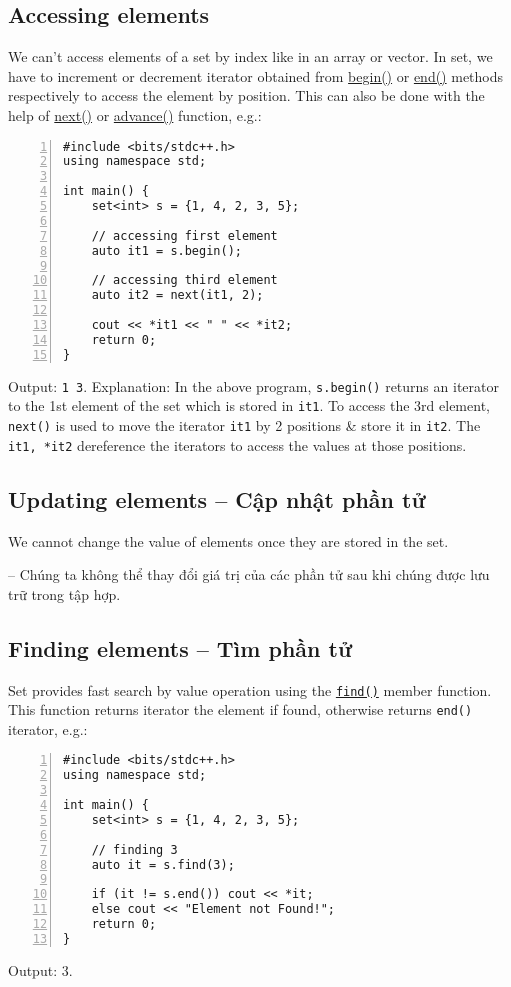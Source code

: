 \documentclass{article}
\begin{document}
\subsection{Accessing elements}
We can't access elements of a set by index like in an array or vector. In set, we have to increment or decrement iterator obtained from \href{https://www.geeksforgeeks.org/access-element-in-set-in-cpp/}{begin()} or \href{https://www.geeksforgeeks.org/setbegin-setend-c-stl/}{end()} methods respectively to access the element by position. This can also be done with the help of \href{https://www.geeksforgeeks.org/stdnext-in-cpp/}{next()} or \href{https://www.geeksforgeeks.org/stdadvance-in-cpp/}{advance()} function, e.g.:
\begin{Verbatim}[numbers=left,xleftmargin=5mm]
#include <bits/stdc++.h>
using namespace std;

int main() {
    set<int> s = {1, 4, 2, 3, 5};
	
    // accessing first element
    auto it1 = s.begin();
	
    // accessing third element
    auto it2 = next(it1, 2);
	
    cout << *it1 << " " << *it2;
    return 0;
}
\end{Verbatim}
Output: {\tt1 3}. Explanation: In the above program, {\tt s.begin()} returns an iterator to the 1st element of the set which is stored in {\tt it1}. To access the 3rd element, {\tt next()} is used to move the iterator {\tt it1} by 2 positions \& store it in {\tt it2}. The {\tt*it1, *it2} dereference the iterators to access the values at those positions.


\subsection{Updating elements -- Cập nhật phần tử}
We cannot change the value of elements once they are stored in the set.

-- Chúng ta không thể thay đổi giá trị của các phần tử sau khi chúng được lưu trữ trong tập hợp.


\subsection{Finding elements -- Tìm phần tử}
Set provides fast search by value operation using the \href{https://www.geeksforgeeks.org/set-find-function-in-c-stl/}{\tt find()} member function. This function returns iterator the element if found, otherwise returns {\tt end()} iterator, e.g.:
\begin{Verbatim}[numbers=left,xleftmargin=5mm]
#include <bits/stdc++.h>
using namespace std;

int main() {
    set<int> s = {1, 4, 2, 3, 5};
	
    // finding 3
    auto it = s.find(3);
	
    if (it != s.end()) cout << *it;
    else cout << "Element not Found!";
    return 0;
}
\end{Verbatim}
Output: 3.
\end{document}
